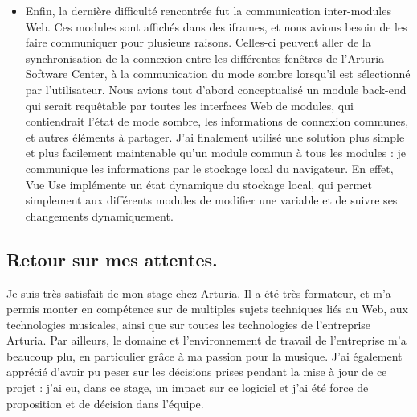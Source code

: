 \documentclass[francais]{rapportPFE}  %
\begin{document}
\begin{itemize}
    \item Enfin, la dernière difficulté rencontrée fut la communication inter-modules Web. Ces modules sont affichés dans des iframes, et nous avions besoin de les faire communiquer pour plusieurs raisons. Celles-ci peuvent aller de la synchronisation de la connexion entre les différentes fenêtres de l'Arturia Software Center, à la communication du mode sombre lorsqu'il est sélectionné par l'utilisateur. Nous avions tout d'abord conceptualisé un module back-end qui serait requêtable par toutes les interfaces Web de modules, qui contiendrait l'état de mode sombre, les informations de connexion communes, et autres éléments à partager. J'ai finalement utilisé une solution plus simple et plus facilement maintenable qu'un module commun à tous les modules : je communique les informations par le stockage local du navigateur. En effet, Vue Use implémente un état dynamique du stockage local, qui permet simplement aux différents modules de modifier une variable et de suivre ses changements dynamiquement.
\end{itemize}
% 

\subsection{Retour sur mes attentes.}
Je suis très satisfait de mon stage chez Arturia. Il a été très formateur, et m'a permis monter en compétence sur de multiples sujets techniques liés au Web, aux technologies musicales, ainsi que sur toutes les technologies de l'entreprise Arturia.
Par ailleurs, le domaine et l'environnement de travail de l'entreprise m'a beaucoup plu, en particulier grâce à ma passion pour la musique.
J'ai également apprécié d'avoir pu peser sur les décisions prises pendant la mise à jour de ce projet : j'ai eu, dans ce stage, un impact sur ce logiciel et j'ai été force de proposition et de décision dans l'équipe. 



\end{document}
